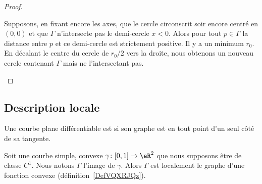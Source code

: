 \begin{proof}
\begin{subproof}

		Supposons, en fixant encore les axes, que le cercle circonscrit soir encore centré en \( (0,0)\) et que \( \Gamma\) n'intersecte pas le demi-cercle \( x<0\). Alors pour tout \( p\in \Gamma\) la distance entre \( p\) et ce demi-cercle est strictement positive. Il y a un minimum \( r_0\). En décalant le centre du cercle de \( r_0/2\) vers la droite, nous obtenons un nouveau cercle contenant \( \Gamma\) mais ne l'intersectant pas.
	\end{subproof}
\end{proof}

\subsection{Description locale}

\begin{definition}      \label{DEFooVQODooJSNYLw}
	Une courbe plane différentiable est  si son graphe est en tout point d'un seul côté de sa tangente.
\end{definition}

\begin{lemma}        \label{LEMooGEVEooHxPTMO}
	Soit une courbe simple, convexe \( \gamma\colon \mathopen[ 0 , 1 \mathclose]\to \eR^2\) que nous supposons être de classe \( C^1\). Nous notons \( \Gamma\) l'image de \( \gamma\). Alors \( \Gamma\) est localement le graphe d'une fonction convexe (définition~\ref{DefVQXRJQz}).
\end{lemma}

